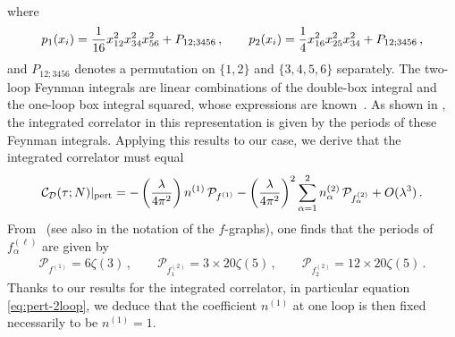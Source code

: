 \documentclass[aps,prl,twocolumn, longbibliography,footinbib,superscriptaddress, preprintnumbers]{revtex4-1}
\newcommand{\<}{\langle}
\renewcommand{\>}{\rangle}
\begin{document}
{\begin{align}
\end{align}
     where
\begin{align} \label{eq:P1P2}
    p_1(x_i) = {1\over 16} x_{12}^2 x_{34}^2 x_{56}^2 + P_{12;3456} \, , \qquad
        p_2(x_i) = {1\over 4} x_{16}^2 x_{25}^2 x_{34}^2 + P_{12;3456} \, ,
\end{align}
and $P_{12;3456}$ denotes a  permutation on $\{1,2\}$ and $\{3,4,5,6\}$ separately.  The two-loop Feynman integrals are linear combinations of the double-box integral and the one-loop box integral squared, whose expressions are known~\cite{Usyukina:1993ch}. As shown in \cite{Wen:2022oky, Brown:2023zbr}, the integrated correlator in this representation is given by the periods of these Feynman integrals. Applying this results to our case, we derive that the integrated correlator must equal
\begin{align}
    \mathcal{C}_{\mathcal{D}} (\tau; N)\vert_{\rm pert} = -\left( {\lambda \over 4\pi^2} \right) n^{(1)}\, \mathcal{P}_{f^{(1)}} - \left( {\lambda \over 4\pi^2} \right)^2 \sum_{\alpha=1}^2 n^{(2)}_{\alpha}\, \mathcal{P}_{f^{(2)}_{\alpha}} + O(\lambda^3)\,.
\end{align}
From~\cite{Belokurov:1983km} (see also \cite{Wen:2022oky} in the notation of the $f$-graphs), one finds that the periods of $f^{(\ell)}_\alpha$ are given by
    \begin{align}
    \mathcal{P}_{f^{(1)}} = 6 \zeta(3) \,  , \qquad   \mathcal{P}_{f^{(2)}_1} = 3 \times 20 \zeta(5) \, , \qquad  \mathcal{P}_{f^{(2)}_2} = 12 \times 20 \zeta(5) \, .
    \end{align}
Thanks to our results for the integrated correlator, in particular equation \eqref{eq:pert-2loop}, we deduce that the coefficient $n^{(1)}$ at one loop is then fixed necessarily to be $n^{(1)}=1$.

}
\end{document}
